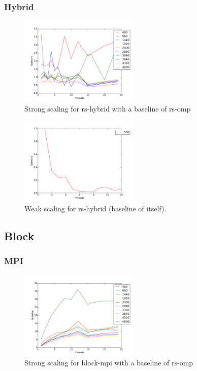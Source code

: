 \subsubsection{Hybrid}

\begin{figure}[ht]
\centering
\includegraphics[width=0.5\textwidth]{plots/strong_rs-hybrid_baseline-rs-omp--1.pdf}
\caption{Strong scaling for rs-hybrid with a baseline of rs-omp}
\label{strong-rs-hybrid}
\end{figure}

\begin{figure}[ht]
\centering
\includegraphics[width=0.5\textwidth]{plots/weak_rs-hybrid.pdf}
\caption{Weak scaling for rs-hybrid (baseline of itself).}
\label{weak-rs-hybrid}
\end{figure}


\subsection{Block}

\subsubsection{MPI}

\begin{figure}[ht]
\centering
\includegraphics[width=0.5\textwidth]{plots/strong_block-mpi_baseline-rs-omp--1.pdf}
\caption{Strong scaling for block-mpi with a baseline of rs-omp}
\label{strong-block-mpi}
\end{figure}

